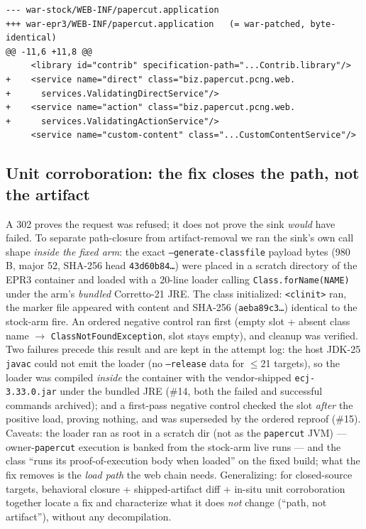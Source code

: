 \documentclass[journal]{IEEEtran}
\begin{document}
\begin{lstlisting}[style=shell, caption={The fix, located by shipped-spec diff
alone (\texttt{evidence/phase05/static/} wp4c): stock adds nothing; EPR3 and
25.0.13 ship the \emph{same} two service overrides; engine jars identical
across arms. This is a mechanism \emph{location} argument from bytes the vendor
ships — not a source-code claim.}, label={lst:spec}]
--- war-stock/WEB-INF/papercut.application
+++ war-epr3/WEB-INF/papercut.application   (= war-patched, byte-identical)
@@ -11,6 +11,8 @@
     <library id="contrib" specification-path="...Contrib.library"/>
+    <service name="direct" class="biz.papercut.pcng.web.
+      services.ValidatingDirectService"/>
+    <service name="action" class="biz.papercut.pcng.web.
+      services.ValidatingActionService"/>
     <service name="custom-content" class="...CustomContentService"/>
\end{lstlisting}

\subsection{Unit corroboration: the fix closes the path, not the artifact}
\label{sec:unitcorr}
A 302 proves the request was refused; it does not prove the sink \emph{would}
have failed. To separate path-closure from artifact-removal we ran the sink's
own call shape \emph{inside the fixed arm}: the exact
\texttt{--generate-classfile} payload bytes (980 B, major 52, SHA-256 head
\texttt{43d60b84\ldots}) were placed in a scratch directory of the EPR3
container and loaded with a 20-line loader calling \texttt{Class.forName(NAME)}
under the arm's \emph{bundled} Corretto-21 JRE. The class initialized:
\texttt{<clinit>} ran, the marker file appeared with content and SHA-256
(\texttt{aeba89c3\ldots}) identical to the stock-arm fire. An ordered negative
control ran first (empty slot + absent class name $\rightarrow$
\texttt{ClassNotFoundException}, slot stays empty), and cleanup was verified.
Two failures precede this result and are kept in the attempt log: the host
JDK-25 \texttt{javac} could not emit the loader (no \texttt{--release} data for
$\leq$21 targets), so the loader was compiled \emph{inside} the container with
the vendor-shipped \texttt{ecj-3.33.0.jar} under the bundled JRE (\#14, both
the failed and successful commands archived); and a first-pass negative control
checked the slot \emph{after} the positive load, proving nothing, and was
superseded by the ordered reproof (\#15). Caveats: the loader ran as root in a
scratch dir (not as the \texttt{papercut} JVM) — owner-\texttt{papercut}
execution is banked from the stock-arm live runs — and the class ``runs its
proof-of-execution body when loaded'' on the fixed build; what the fix removes is the
\emph{load path} the web chain needs. Generalizing: for closed-source targets,
behavioral closure + shipped-artifact diff + in-situ unit corroboration
together locate a fix and characterize what it does \emph{not} change
(``path, not artifact''), without any decompilation.
\end{document}
